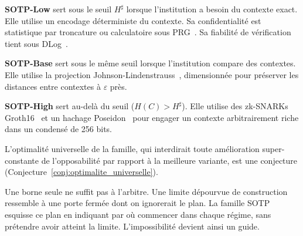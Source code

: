 \begin{sloppypar}
\textbf{SOTP-Low} sert sous le seuil $H^\sharp$ lorsque l'institution a besoin du contexte
exact. Elle utilise un encodage d\'eterministe du contexte. Sa confidentialit\'e est
statistique par troncature ou calculatoire sous PRG~\cite{BlumMicali84}. Sa fiabilit\'e
de v\'erification tient sous DLog~\cite{DiffieHellman76}.

\textbf{SOTP-Base} sert sous le m\^eme seuil lorsque l'institution compare des contextes. Elle utilise la projection
Johnson-Lindenstrauss~\cite{JohnsonLindenstrauss84,DasguptaGupta03}, dimensionn\'ee
pour pr\'eserver les distances entre contextes \`a $\varepsilon$ pr\`es.

\textbf{SOTP-High} sert au-del\`a du seuil ($H(C) > H^\sharp$). Elle utilise des zk-SNARKs
Groth16~\cite{Groth16,BCTV14} et un hachage Poseidon~\cite{Poseidon2019} pour
engager un contexte arbitrairement riche dans un condens\'e de 256 bits.

L'optimalit\'e universelle de la famille, qui interdirait toute am\'elioration
super-constante de l'opposabilit\'e par rapport \`a la meilleure variante, est une
conjecture (Conjecture~\ref{conj:optimalite_universelle}).

\begin{boiteArbitre}
Une borne seule ne suffit pas \`a l'arbitre. Une limite
d\'epourvue de construction ressemble \`a une porte ferm\'ee dont on ignorerait le plan. La famille SOTP
esquisse ce plan en indiquant par o\`u commencer dans chaque r\'egime, sans
pr\'etendre avoir atteint la limite. L'impossibilit\'e devient ainsi un guide.
\end{boiteArbitre}

\end{sloppypar}

